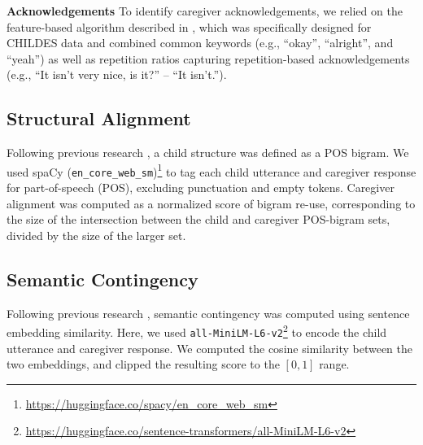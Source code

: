 \noindent \textbf{Acknowledgements} To identify caregiver acknowledgements, we relied on the feature-based algorithm described in \citet{nikolaus_communicative_2023a}, which was specifically designed for CHILDES data and combined common keywords (e.g., ``okay'', ``alright'', and ``yeah'') as well as repetition ratios capturing repetition-based acknowledgements (e.g., ``It isn’t very nice, is it?'' – ``It isn't.''). 

\subsection*{Structural Alignment}


Following previous research \cite{dale_unraveling_2006, fernandez_quantifying_2014}, a child structure was defined as a POS bigram. We used spaCy (\texttt{en\_core\_web\_sm})\footnote{\url{https://huggingface.co/spacy/en_core_web_sm}} to tag each child utterance and caregiver response for part-of-speech (POS), excluding punctuation and empty tokens. Caregiver alignment was computed as a normalized score of bigram re-use, corresponding to the size of the intersection between the child and caregiver POS-bigram sets, divided by the size of the larger set.

\subsection*{Semantic Contingency}

Following previous research \cite[e.g.,][]{fusaroli_caregiver_2023, foushee2022getting}, semantic contingency was computed using sentence embedding similarity. Here, we used \texttt{all-MiniLM-L6-v2}\footnote{\url{https://huggingface.co/sentence-transformers/all-MiniLM-L6-v2}} to encode the child utterance and caregiver response. We computed the cosine similarity between the two embeddings, and clipped the resulting score to the $[0,1]$ range.

